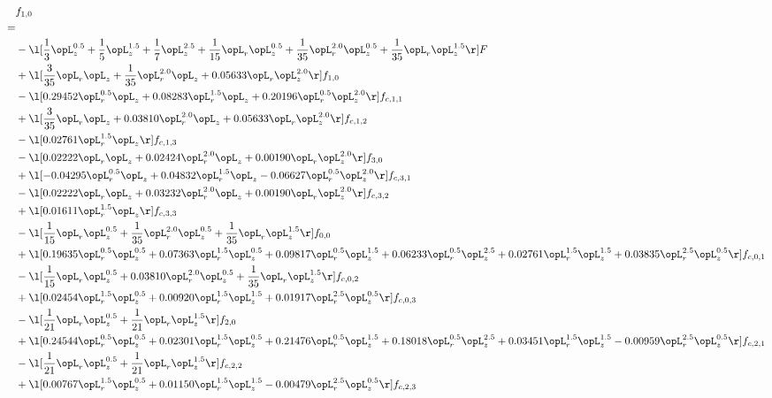 \begin{alignat}{2} 
\label{eq:f_10_1} 
& f_{1,0} \nonumber \\ 
 = \\ 
& - \l[ \frac{1}{3} \opL_z^{0.5} + \frac{1}{5} \opL_z^{1.5} + \frac{1}{7} \opL_z^{2.5} + \frac{1}{15} \opL_r \opL_z^{0.5} + \frac{1}{35} \opL_r^{2.0} \opL_z^{0.5} + \frac{1}{35} \opL_r \opL_z^{1.5}  \r] F \nonumber \\ 
& + \l[ \frac{3}{35} \opL_r \opL_z + \frac{1}{35} \opL_r^{2.0} \opL_z +  0.05633 \opL_r \opL_z^{2.0}  \r] f_{1,0} \nonumber \\ 
& - \l[  0.29452 \opL_r^{0.5} \opL_z +  0.08283 \opL_r^{1.5} \opL_z +  0.20196 \opL_r^{0.5} \opL_z^{2.0}  \r] f_{c,1,1} \nonumber \\ 
& + \l[ \frac{3}{35} \opL_r \opL_z +  0.03810 \opL_r^{2.0} \opL_z +  0.05633 \opL_r \opL_z^{2.0}  \r] f_{c,1,2} \nonumber \\ 
& - \l[  0.02761 \opL_r^{1.5} \opL_z  \r] f_{c,1,3} \nonumber \\ 
& - \l[  0.02222 \opL_r \opL_z +  0.02424 \opL_r^{2.0} \opL_z +  0.00190 \opL_r \opL_z^{2.0}  \r] f_{3,0} \nonumber \\ 
& + \l[  -0.04295 \opL_r^{0.5} \opL_z +  0.04832 \opL_r^{1.5} \opL_z   -0.06627 \opL_r^{0.5} \opL_z^{2.0}  \r] f_{c,3,1} \nonumber \\ 
& - \l[  0.02222 \opL_r \opL_z +  0.03232 \opL_r^{2.0} \opL_z +  0.00190 \opL_r \opL_z^{2.0}  \r] f_{c,3,2} \nonumber \\ 
& + \l[  0.01611 \opL_r^{1.5} \opL_z  \r] f_{c,3,3} \nonumber \\ 
& - \l[ \frac{1}{15} \opL_r \opL_z^{0.5} + \frac{1}{35} \opL_r^{2.0} \opL_z^{0.5} + \frac{1}{35} \opL_r \opL_z^{1.5}  \r] f_{0,0} \nonumber \\ 
& + \l[  0.19635 \opL_r^{0.5} \opL_z^{0.5} +  0.07363 \opL_r^{1.5} \opL_z^{0.5} +  0.09817 \opL_r^{0.5} \opL_z^{1.5} +  0.06233 \opL_r^{0.5} \opL_z^{2.5} +  0.02761 \opL_r^{1.5} \opL_z^{1.5} +  0.03835 \opL_r^{2.5} \opL_z^{0.5}  \r] f_{c,0,1} \nonumber \\ 
& - \l[ \frac{1}{15} \opL_r \opL_z^{0.5} +  0.03810 \opL_r^{2.0} \opL_z^{0.5} + \frac{1}{35} \opL_r \opL_z^{1.5}  \r] f_{c,0,2} \nonumber \\ 
& + \l[  0.02454 \opL_r^{1.5} \opL_z^{0.5} +  0.00920 \opL_r^{1.5} \opL_z^{1.5} +  0.01917 \opL_r^{2.5} \opL_z^{0.5}  \r] f_{c,0,3} \nonumber \\ 
& - \l[ \frac{1}{21} \opL_r \opL_z^{0.5} + \frac{1}{21} \opL_r \opL_z^{1.5}  \r] f_{2,0} \nonumber \\ 
& + \l[  0.24544 \opL_r^{0.5} \opL_z^{0.5} +  0.02301 \opL_r^{1.5} \opL_z^{0.5} +  0.21476 \opL_r^{0.5} \opL_z^{1.5} +  0.18018 \opL_r^{0.5} \opL_z^{2.5} +  0.03451 \opL_r^{1.5} \opL_z^{1.5}   -0.00959 \opL_r^{2.5} \opL_z^{0.5}  \r] f_{c,2,1} \nonumber \\ 
& - \l[ \frac{1}{21} \opL_r \opL_z^{0.5} + \frac{1}{21} \opL_r \opL_z^{1.5}  \r] f_{c,2,2} \nonumber \\ 
& + \l[  0.00767 \opL_r^{1.5} \opL_z^{0.5} +  0.01150 \opL_r^{1.5} \opL_z^{1.5}   -0.00479 \opL_r^{2.5} \opL_z^{0.5}  \r] f_{c,2,3} \nonumber \\ 
\end{alignat} 


